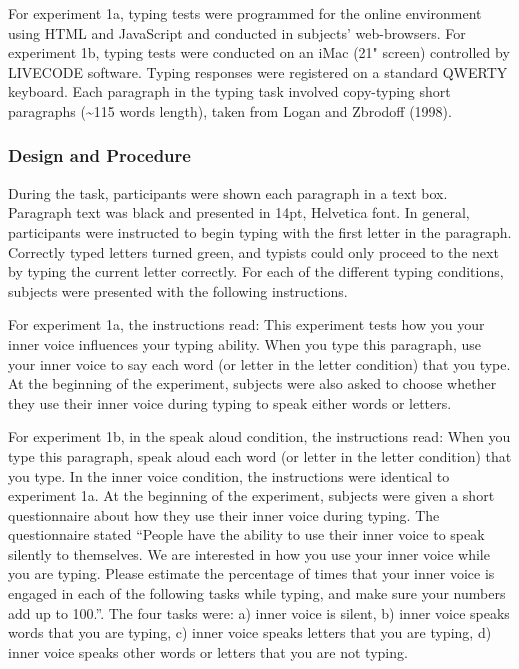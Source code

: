 \documentclass[floatsintext,man]{apa6}
\theoremstyle{definition}
\theoremstyle{definition}
\theoremstyle{definition}
\theoremstyle{remark}
\begin{document}
For experiment 1a, typing tests were programmed for the online
environment using HTML and JavaScript and conducted in subjects'
web-browsers. For experiment 1b, typing tests were conducted on an iMac
(21" screen) controlled by LIVECODE software. Typing responses were
registered on a standard QWERTY keyboard. Each paragraph in the typing
task involved copy-typing short paragraphs (\textasciitilde{}115 words
length), taken from Logan and Zbrodoff (1998).

\subsubsection{Design and Procedure}\label{design-and-procedure}

During the task, participants were shown each paragraph in a text box.
Paragraph text was black and presented in 14pt, Helvetica font. In
general, participants were instructed to begin typing with the first
letter in the paragraph. Correctly typed letters turned green, and
typists could only proceed to the next by typing the current letter
correctly. For each of the different typing conditions, subjects were
presented with the following instructions.

For experiment 1a, the instructions read: This experiment tests how you
your inner voice influences your typing ability. When you type this
paragraph, use your inner voice to say each word (or letter in the
letter condition) that you type. At the beginning of the experiment,
subjects were also asked to choose whether they use their inner voice
during typing to speak either words or letters.

For experiment 1b, in the speak aloud condition, the instructions read:
When you type this paragraph, speak aloud each word (or letter in the
letter condition) that you type. In the inner voice condition, the
instructions were identical to experiment 1a. At the beginning of the
experiment, subjects were given a short questionnaire about how they use
their inner voice during typing. The questionnaire stated
\enquote{People have the ability to use their inner voice to speak
silently to themselves. We are interested in how you use your inner
voice while you are typing. Please estimate the percentage of times that
your inner voice is engaged in each of the following tasks while typing,
and make sure your numbers add up to 100.}. The four tasks were: a)
inner voice is silent, b) inner voice speaks words that you are typing,
c) inner voice speaks letters that you are typing, d) inner voice speaks
other words or letters that you are not typing.
\end{document}

